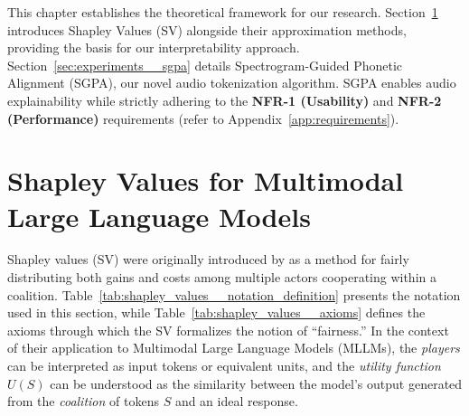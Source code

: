 This chapter establishes the theoretical framework for our research. Section~\ref{sec:shapley_values} introduces Shapley Values (SV) alongside their approximation methods, providing the basis for our interpretability approach. Section~\ref{sec:experiments__sgpa} details Spectrogram-Guided Phonetic Alignment (SGPA), our novel audio tokenization algorithm. SGPA enables audio explainability while strictly adhering to the \textbf{NFR-1 (Usability)} and \textbf{NFR-2 (Performance)} requirements (refer to Appendix~\ref{app:requirements}).

\section{Shapley Values for Multimodal Large Language Models}
\label{sec:shapley_values}

Shapley values (SV) were originally introduced by \textcite{RM-670-PR} as a method for fairly distributing both gains and costs among multiple actors cooperating within a coalition.  Table~\ref{tab:shapley_values__notation_definition} presents the notation used in this section, while Table~\ref{tab:shapley_values__axioms} defines the axioms through which the SV formalizes the notion of ``fairness.'' In the context of their application to Multimodal Large Language Models (MLLMs), the \textit{players} can be interpreted as input tokens or equivalent units, and the \textit{utility function} $U(S)$ can be understood as the similarity between the model’s output generated from the \textit{coalition} of tokens $S$ and an ideal response.

